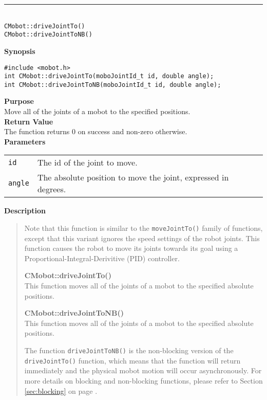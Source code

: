 \noindent
\vspace{5pt}
\rule{4.5in}{0.015in}\\
\noindent
{\LARGE \texttt{CMobot::driveJointTo()}}\\
{\LARGE \texttt{CMobot::driveJointToNB()}}\\
{}

\noindent
{\bf Synopsis}
\vspace{-8pt}
\begin{verbatim}
#include <mobot.h>
int CMobot::driveJointTo(moboJointId_t id, double angle);
int CMobot::driveJointToNB(moboJointId_t id, double angle);
\end{verbatim}

\noindent
{\bf Purpose}\\
Move all of the joints of a mobot to the specified positions.\\

\noindent
{\bf Return Value}\\
The function returns 0 on success and non-zero otherwise.\\

\noindent
{\bf Parameters}\\
\vspace{-0.1in}
\begin{description}
\item               
\begin{tabular}{p{15 mm}p{105 mm}}
\texttt{id} & The id of the joint to move. \\
\texttt{angle} & The absolute position to move the joint, expressed in degrees. \\
\end{tabular}
\end{description}
\noindent

{\bf Description}\\
\vspace{-12pt}
\begin{quote}
Note that this function is similar to the \texttt{moveJointTo()} family of functions, except
that this variant ignores the speed settings of the robot joints. This function causes
the robot to move its joints towards its goal using a Proportional-Integral-Derivitive (PID)
controller.

{\bf CMobot::driveJointTo()}\\
This function moves all of the joints of a mobot to the specified absolute positions. 

{\bf CMobot::driveJointToNB()}\\
This function moves all of the joints of a mobot to the specified absolute positions. 

The function \texttt{driveJointToNB()} is the non-blocking version of
the \texttt{driveJointTo()} function, which means that the function will return
immediately and the physical mobot motion will occur asynchronously. For
more details on blocking and non-blocking functions, please refer to 
Section \ref{sec:blocking} on page \pageref{sec:blocking}.\\
\end{quote}

